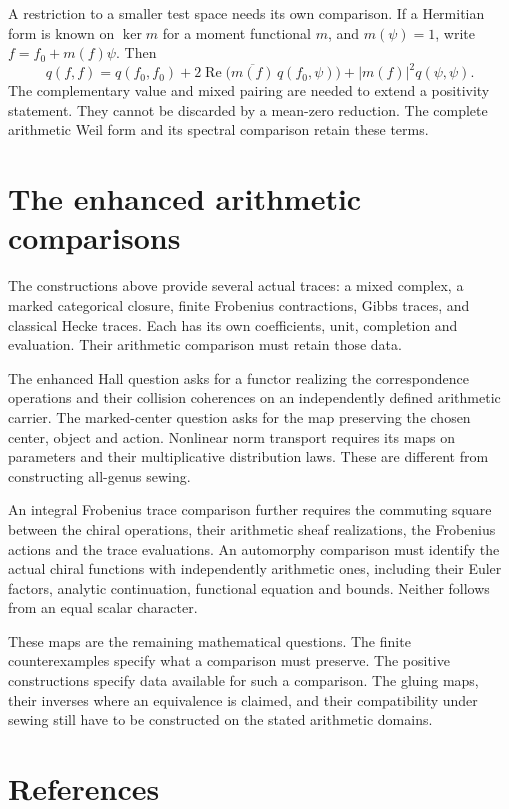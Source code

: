 A restriction to a smaller test space needs its own comparison. If a
Hermitian form is known on $\ker m$ for a moment functional $m$, and
$m(\psi)=1$, write $f=f_0+m(f)\psi$. Then
\[
 q(f,f)=q(f_0,f_0)
  +2\operatorname{Re}
       \bigl(\overline{m(f)}\,q(f_0,\psi)\bigr)
  +|m(f)|^2q(\psi,\psi).
\]
The complementary value and mixed pairing are needed to extend a positivity
statement. They cannot be discarded by a mean-zero reduction. The complete
arithmetic Weil form and its spectral comparison retain these terms.

\section{The enhanced arithmetic comparisons}

The constructions above provide several actual traces: a mixed complex, a
marked categorical closure, finite Frobenius contractions, Gibbs traces, and
classical Hecke traces. Each has its own coefficients, unit, completion and
evaluation. Their arithmetic comparison must retain those data.

The enhanced Hall question asks for a functor realizing the correspondence
operations and their collision coherences on an independently defined
arithmetic carrier. The marked-center question asks for the map preserving
the chosen center, object and action. Nonlinear norm transport requires its
maps on parameters and their multiplicative distribution laws. These are
different from constructing all-genus sewing.

An integral Frobenius trace comparison further requires the commuting square
between the chiral operations, their arithmetic sheaf realizations, the
Frobenius actions and the trace evaluations. An automorphy comparison must
identify the actual chiral functions with independently arithmetic ones,
including their Euler factors, analytic continuation, functional equation
and bounds. Neither follows from an equal scalar character.

These maps are the remaining mathematical questions. The finite
counterexamples specify what a comparison must preserve. The positive
constructions specify data available for such a comparison. The gluing maps,
their inverses where an equivalence is claimed, and their compatibility
under sewing still have to be constructed on the stated arithmetic domains.


\section*{References}

